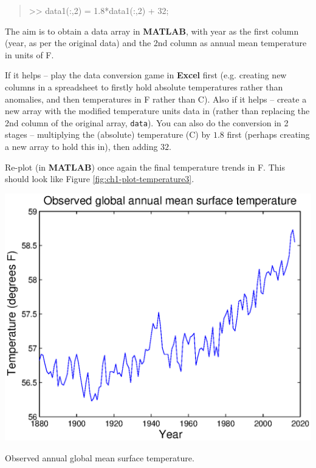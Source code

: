 \documentclass{tufte-book} %
\newenvironment{docspec}{\begin{quotation}\ttfamily\parskip0pt\parindent0pt\ignorespaces}{\end{quotation}}
\begin{document}
\begin{docspec}
>> data1(:,2) = 1.8*data1(:,2) + 32;
\end{docspec}
 
\noindent The aim is to obtain a data array in \textbf{MATLAB}, with year as the first column (year, as per the original data) and the 2nd  column as annual mean  temperature in units of \degree F.

If it helps -- play  the data conversion game in \textbf{Excel} first (e.g. creating new columns in a spreadsheet to firstly hold  absolute temperatures rather than anomalies, and then temperatures in \degree F rather than \degree C). Also if it helps -- create a new array with the modified temperature units data in (rather than replacing the 2nd column of  the original array, \texttt{data}). You can also do the conversion in 2 stages -- multiplying the (absolute) temperature (\degree C) by \(1.8\) first (perhaps creating a new array to hold this in), then adding \(32\).

Re-plot (in \textbf{MATLAB}) once again the final temperature trends in \degree F. This should look like Figure \ref{fig:ch1-plot-temperature3}.

\begin{marginfigure}[0.0in]
\includegraphics[width=\linewidth]{ch1-plot-temperature3.eps}
\caption{Observed annual global mean surface temperature.}
\label{fig:ch1-plot-temperature3}
\end{marginfigure}

\end{document}
